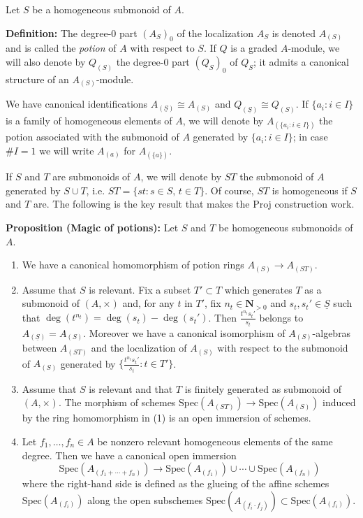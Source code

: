 \documentclass[graybox]{svmult}
\begin{document}
Let $S$ be a homogeneous submonoid of $A$. 


\vspace{0.25\baselineskip}
\noindent
\textbf{\textbf{Definition:}}
The degree-$0$ part $(A_S)_0$ of the localization $A_{S}$ is denoted $A_{(S)}$ and is called the \emph{potion} of $A$ with respect to $S$. 
If $Q$ is a graded $A$-module, we will also denote by $Q_{(S)}$ the degree-$0$ part $(Q_S)_0$ of $Q_S$; it admits a canonical structure of an $A_{(S)}$-module.




We have canonical identifications
$A_{(\underline{S})} \cong A_{(S)}$ and $Q_{(\underline{S})} \cong Q_{(S)}$.
If  $\{a_i : i \in I \}$ is a family of homogeneous elements of $A$, we will denote by
$A_{(\{a_i : i \in I \})}$
the potion associated with the submonoid of $A$ generated by $\{a_i : i \in I \}$; in case $\#I=1$ we will write $A_{(a)}$ for $A_{(\{a\})}$.

If $S$ and $T$ are submonoids of $A$, we will denote by $ST$ the submonoid of $A$ generated by $S \cup T$, i.e. $ST = \{st : s \in S, \, t \in T \}$. Of course, $ST$ is homogeneous if $S$ and $T$ are.
The following is the key result that makes the Proj construction work.

\vspace{0.25\baselineskip}
\noindent
\textbf{{Proposition (Magic of potions):}}
Let $S$ and $T$ be homogeneous submonoids of $A$. 
\begin{enumerate}
\item 
\label{it:magic-1}
We have a canonical homomorphism of potion rings 
$A_{(S )} \to  A_{(ST )}$.
\item 
\label{it:magic-2}
Assume that $S$ is relevant. Fix a subset $T' \subset T$ which generates $T$ as a submonoid of $(A,\times)$ and, for any $t $ in $T'$, fix $n_t \in \mathbf{N}_{>0}$ and $s_t, s_t' \in \underline{S}$ such that $\deg(t^{n_t}) = \deg(s_t)-\deg(s_t')$.
Then $\frac{t^{n_t} s_t'} { s_t}$ belongs to $A_{(\underline{S} )}=A_{(S)}$. 
 Moreover we have a canonical isomorphism of $A_{(S )}$-algebras between $ A_{(ST )}$ and the localization of $A_{(S )}$ with respect to the submonoid of $A_{(S)}$ generated by $\{\frac{t^{n_t} s_t'} { s_t} : t \in T' \}$.
\item 
\label{it:magic-3}
Assume that $S$ is relevant and that $T$ is finitely generated as submonoid of $(A,\times)$. The morphism of schemes 
$
\mathrm{Spec} (A_{(ST )}) \to \mathrm{Spec} (A_{(S)})
$
induced by the ring homomorphism in (1) is an open immersion of schemes.
\item 
\label{it:magic-4}
Let $f_1, \ldots, f_n \in A$ be nonzero relevant homogeneous elements of the same degree.
Then we have a canonical open immersion
\[
\mathrm{Spec}(A_{ (f_1 + \cdots + f_n) }) \to \mathrm{Spec} (A_{(f_1)}) \cup \cdots \cup \mathrm{Spec} (A_{(f_n)})
\]
where the right-hand side is defined as the glueing of the affine schemes $\mathrm{Spec} (A_{(f_i)})$ along the open subschemes $\mathrm{Spec} (A_{(f_i \cdot f_j)}) \subset \mathrm{Spec} (A_{(f_i)})$.
\end{enumerate}
\end{document}
